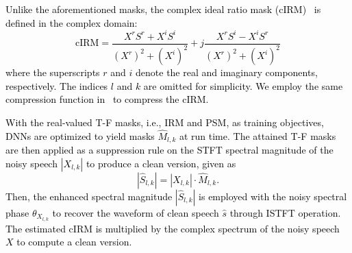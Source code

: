 \documentclass[journal]{IEEEtran}
\begin{document}
\textcolor{black}{Unlike the aforementioned masks, the complex ideal ratio mask (cIRM)~\cite{cirm} is defined in the complex domain:
\begin{equation}
\text{cIRM}=\frac{X^{r} S^{r} +X^{i} S^{i}}{(X^{r})^2+(X^{i})^2}+j \frac{X^{r} S^{i}-X^{i} S^{r}}{(X^{r})^2+(X^{i})^2}
\end{equation}
where the superscripts $r$ and $i$ denote the real and imaginary components, respectively. The indices $l$ and $k$ are omitted for simplicity. We employ the same compression function in~\cite{cirm} to compress the cIRM.
}


\textcolor{black}{With the real-valued T-F masks, i.e., IRM and PSM, as training objectives, DNNs are optimized to yield masks $\widehat{M}_{l,k}$ at run time. The attained T-F masks are then applied as a suppression rule on the STFT spectral magnitude of the noisy speech $|X_{l,k}|$ to produce a clean version, given as
\begin{equation}
|\widehat{S}_{l,k}|\!=\!|X_{l,k}|\!\cdot\!\widehat{M}_{l,k}.
\end{equation}
Then, the enhanced spectral magnitude $|\widehat{S}_{l,k}|$ is employed with the noisy spectral phase $\theta_{X_{l,k}}$ to recover the waveform of clean speech $\widehat{s}$ through ISTFT operation. \textcolor{black}{The estimated cIRM is multiplied by the complex spectrum of the noisy speech $X$ to compute a clean version.}}

\end{document}
